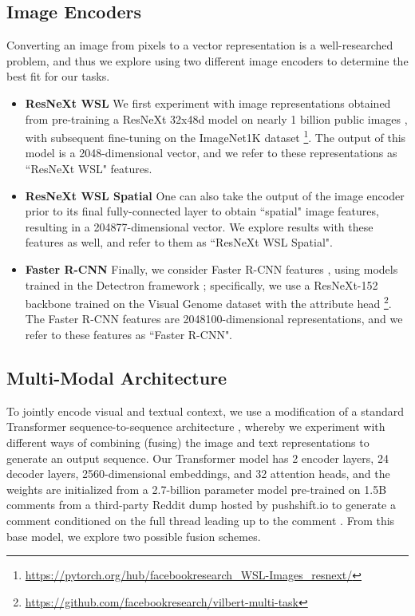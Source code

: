 \documentclass[11pt,a4paper]{article}
\begin{document}
\subsection{Image Encoders}
Converting an image from pixels to a vector representation is a well-researched problem, and thus we explore using two different image encoders to determine the best fit for our tasks.
\begin{itemize}
    \item \textbf{ResNeXt WSL} We first experiment with image representations obtained from pre-training a ResNeXt 32x48d model on nearly 1 billion public images \cite{uru}, with subsequent fine-tuning on the ImageNet1K dataset \cite{imagenet} \footnote{\url{https://pytorch.org/hub/facebookresearch_WSL-Images_resnext/}}. The output of this model is a 2048-dimensional vector, and we refer to these representations as ``ResNeXt WSL" features. 
    \item \textbf{ResNeXt WSL Spatial} One can also take the output of the image encoder prior to its final fully-connected layer to obtain ``spatial" image features, resulting in a 204877-dimensional vector. We explore results with these features as well, and refer to them as ``ResNeXt WSL Spatial".
    \item \textbf{Faster R-CNN} Finally, we consider Faster R-CNN features \cite{Ren_2017}, using models trained in the Detectron framework \cite{Detectron2018}; specifically, we use a ResNeXt-152 backbone trained on the Visual Genome dataset \cite{krishnavisualgenome} with the attribute head \cite{singh2020mmf} \footnote{\url{https://github.com/facebookresearch/vilbert-multi-task}}. The Faster R-CNN features are 2048100-dimensional representations, and we refer to these features as ``Faster R-CNN". 
\end{itemize}


\subsection{Multi-Modal Architecture}
To jointly encode visual and textual context, we use a modification of a standard Transformer sequence-to-sequence architecture \cite{vaswani2017attention}, whereby we experiment with different ways of combining (fusing) the image and text representations to generate an output sequence. Our Transformer model has 2 encoder layers, 24 decoder layers, 2560-dimensional embeddings, and 32 attention heads, and the weights are initialized from a 2.7-billion parameter model pre-trained on 1.5B comments from a third-party Reddit dump hosted by pushshift.io \cite{baumgartner2020pushshift} to generate a comment conditioned on the full thread leading up to the comment \cite{roller2020recipes}. From this base model, we explore two possible fusion schemes. 
\end{document}
